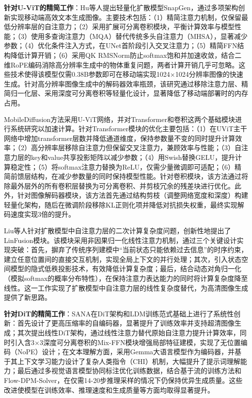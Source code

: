 \documentclass[11pt,a4paper,UTF8]{ctexart}
\begin{document}
\textbf{针对U-ViT的精简工作}：Hu等人\cite{hu2024snapgen}提出轻量化扩散模型SnapGen，通过多项架构创新实现移动端高效文本生成图像。主要技术包括：（1）精简注意力机制，仅保留最低分辨率层的自注意力；（2）采用扩展可分离卷积\cite{howard2017mobilenets}模块，平衡计算效率与模型性能；（3）使用多查询注意力（MQA）\cite{shazeer2019fast}替代传统多头自注意力（MHSA），显著减少参数；（4）优化条件注入方式，在UNet首阶段引入交叉注意力；（5）精简FFN结构降低计算开销；（6）采用QK RMSNorm\cite{henry2020query,zhang2019root}防止softmax饱和并加速收敛，结合二维RoPE编码\cite{su2024roformer}消除高分辨率生成中的物体重复问题，两者计算开销几乎可忽略。这些技术使得该模型仅需0.38B参数即可在移动端实现1024×1024分辨率图像的快速生成。针对高分辨率图像生成中的解码器效率瓶颈，该研究通过移除注意力层、精简归一化层、采用深度可分离卷积等轻量化设计，显著降低了移动端部署时的内存占用。

MobileDiffusion\cite{zhao2024mobilediffusion}方法采用U-ViT网络，并对Transformer和卷积这两个基础模块进行系统研究以加速计算。针对Transformer模块的优化主要包括：（1）在UViT主干网络中增加transformer层数并降低通道维度，保持参数量不变的同时提升计算效率；（2）高分辨率层移除自注意力但保留交叉注意力，兼顾效率与性能；（3）自注意力层的key和value共享投影矩阵以减少参数；（4）用Swish替换GELU，提升计算稳定性；（5）将softmax注意力替换为ReLU，仅需少量微调即可适配；（6）精简前馈层结构，在减少参数量的同时保持模型性能。针对卷积模块，该方法通过将除最外层外的所有卷积层替换为可分离卷积\cite{howard2017mobilenets}、并剪枝冗余的残差块进行优化。此外，针对图像解码器模块，该方法首先通过结构剪枝（调整网络宽度和深度）构建轻量化架构，随后在微调阶段移除KL正则化项并降低对抗损失权重，最终实现解码速度实现3倍的提升。

Liu等人\cite{liu2024linfusion}针对扩散模型中自注意力层的二次计算复杂度问题，创新性地提出了LinFusion模块。该模块采用非因果归一化线性注意力机制，通过三个关键设计实现突破：首先，摒弃了传统序列建模中“当前状态只能依赖过去信息”的时序约束，建立任意位置间的直接交互机制，实现全局上下文的并行处理；其次，引入状态空间模型的隐式低秩投影技术，有效降低计算复杂度；最后，结合动态对角归一化（模拟softmax的概率分布特性），在保持注意力表达能力的同时将计算复杂度降至线性。这一工作实现了扩散模型中自注意力层的线性复杂度替代，为高清图像生成提供了新思路。

\textbf{针对DiT的精简工作}：SANA\cite{xie2024sana}在DiT架构和LDM训练范式基础上进行了系统性创新：首先设计了更高压缩率的自编码器，显著提升了训练效率并支持超清图像生成；其次提出线性DiT架构，通过线性注意力替代原始自注意力提升计算效率，同时引入含3×3深度可分离卷积的Mix-FFN模块增强局部特征建模，实现了无位置编码（NoPE）设计；在文本理解方面，采用Gemma大语言模型\cite{team2024gemma}作为编码器，并基于其上下文学习能力设计了复杂人类指令（CHI）机制，大幅提升了提示词理解能力；最后通过多视觉语言模型协同标注优化训练数据，结合基于流的训练方法\cite{liu2022flow,karras2022elucidating}和Flow-DPM-Solver，在仅需14-20步推理采样的情况下仍保持优异生成质量。这些改进使模型在训练效率、推理速度和生成质量等方面均取得显著提升。
\end{document}
